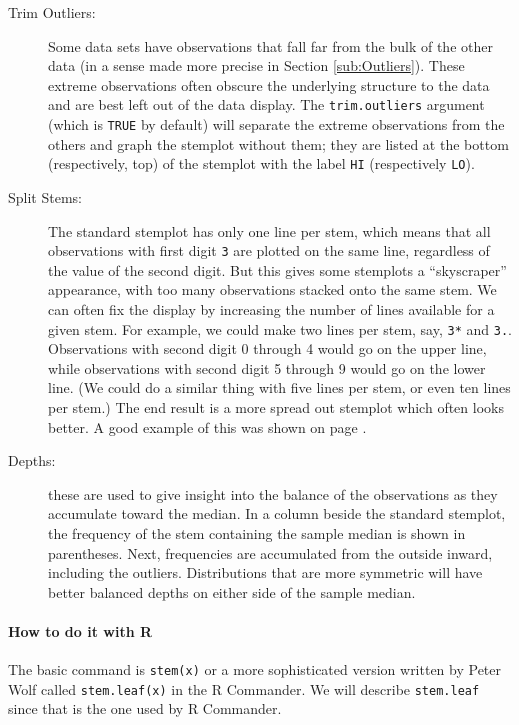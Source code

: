 \documentclass[captions=tableheading]{scrbook}
\begin{document}
\begin{description}
\item[Trim Outliers:] Some data sets have observations that fall far from the bulk of the other data (in a sense made more precise in Section \ref{sub:Outliers}). These extreme observations often obscure the underlying structure to the data and are best left out of the data display. The \texttt{trim.outliers} argument (which is \texttt{TRUE} by default) will separate the extreme observations from the others and graph the stemplot without them; they are listed at the bottom (respectively, top) of the stemplot with the label \texttt{HI} (respectively \texttt{LO}).
\item[Split Stems:] The standard stemplot has only one line per stem, which means that all observations with first digit \texttt{3} are plotted on the same line, regardless of the value of the second digit. But this gives some stemplots a ``skyscraper'' appearance, with too many observations stacked onto the same stem. We can often fix the display by increasing the number of lines available for a given stem. For example, we could make two lines per stem, say, \texttt{3*} and \texttt{3.}. Observations with second digit 0 through 4 would go on the upper line, while observations with second digit 5 through 9 would go on the lower line. (We could do a similar thing with five lines per stem, or even ten lines per stem.) The end result is a more spread out stemplot which often looks better. A good example of this was shown on page \pageref{exa:stemleaf-multiple-lines-stem}.
\item[Depths:] these are used to give insight into the balance of the observations as they accumulate toward the median. In a column beside the standard stemplot, the frequency of the stem containing the sample median is shown in parentheses. Next, frequencies are accumulated from the outside inward, including the outliers. Distributions that are more symmetric will have better balanced depths on either side of the sample median.
\end{description}


\paragraph*{How to do it with \textsf{R}}

The basic command is \texttt{stem(x)} or a more sophisticated version written by Peter Wolf called \texttt{stem.leaf(x)} in the \textsf{R} Commander. We will describe \texttt{stem.leaf} since that is the one used by \textsf{R} Commander.
\end{document}
